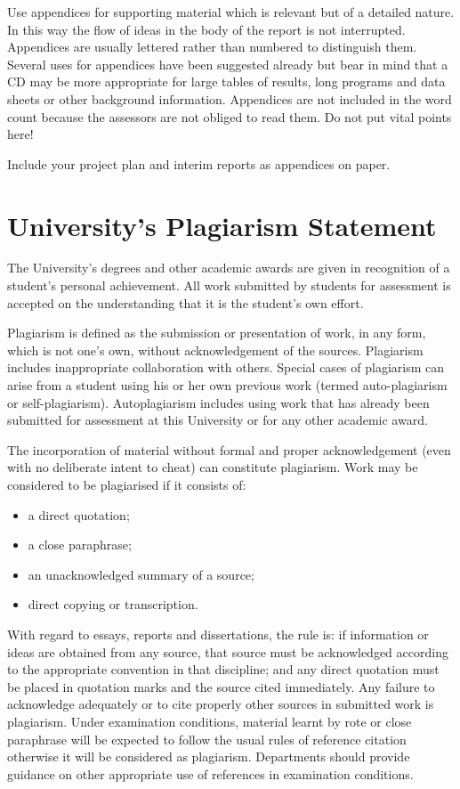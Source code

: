 \documentclass[a4paper,12pt]{article}
\begin{document}
Use appendices for supporting material which is relevant but of a detailed nature. In this way the flow of ideas in the body of the report is not interrupted. Appendices are usually lettered rather than numbered to distinguish them. Several uses for appendices have been suggested already but bear in mind that a CD may be more appropriate for large tables of results, long programs and data sheets or other background information. Appendices are not included in the word count because the assessors are not obliged to read them. Do not put vital points here!

Include your project plan and interim reports as appendices on paper.

\section{University's Plagiarism Statement}
\label{plagiarism sect}

The University's degrees and other academic awards are given in recognition of a student's personal achievement. All work submitted by students for assessment is accepted on the understanding that it is the student's own effort. 

Plagiarism is defined as the submission or presentation of work, in any form, which is not one's own, without acknowledgement of the sources. Plagiarism includes inappropriate collaboration with others. Special cases of plagiarism can arise from a student using his or her own previous work (termed auto-plagiarism or self-plagiarism). Autoplagiarism includes using work that has already been submitted for assessment at this University or for any other academic award.

The incorporation of material without formal and proper acknowledgement (even with no deliberate intent to cheat) can constitute plagiarism. Work may be considered to be plagiarised if it consists of: 
\begin{itemize}
\item
a direct quotation; 
\item
a close paraphrase; 
\item
an unacknowledged summary of a source; 
\item
direct copying or transcription.
\end{itemize}
With regard to essays, reports and dissertations, the rule is: if information or ideas are obtained from any source, that source must be acknowledged according to the appropriate convention in that discipline; and any direct quotation must be placed in quotation marks and the source cited immediately. Any failure to acknowledge adequately or to cite properly other sources in submitted work is plagiarism. Under examination conditions, material learnt by rote or close paraphrase will be expected to follow the usual rules of reference citation otherwise it will be considered as plagiarism. Departments should provide guidance on other appropriate use of references in examination conditions. 
\end{document}

